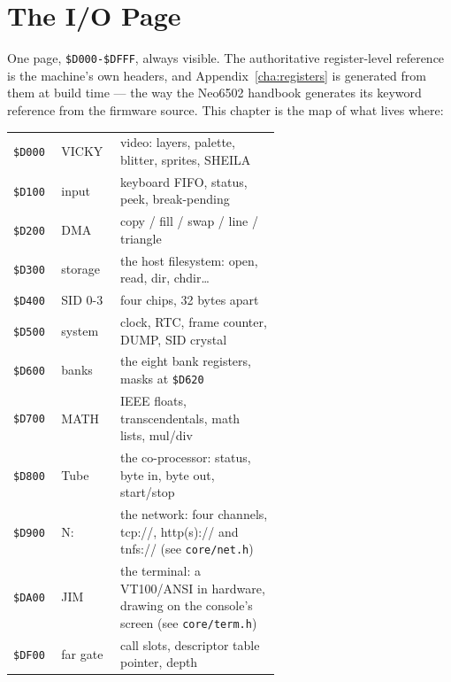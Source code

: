 \chapter{The I/O Page}\label{cha:io}

One page, \texttt{\$D000-\$DFFF}, always visible. The authoritative
register-level reference is the machine's own headers, and
Appendix~\ref{cha:registers} is generated from them at build time --- the
way the Neo6502 handbook generates its keyword reference from the
firmware source. This chapter is the map of what lives where:

\begin{center}
\small
\begin{tabular}{@{}l l >{\raggedright\arraybackslash}p{0.60\linewidth}@{}}
\toprule
\texttt{\$D000} & VICKY   & video: layers, palette, blitter, sprites, SHEILA\\
\texttt{\$D100} & input   & keyboard FIFO, status, peek, break-pending\\
\texttt{\$D200} & DMA     & copy / fill / swap / line / triangle\\
\texttt{\$D300} & storage & the host filesystem: open, read, dir, chdir\ldots\\
\texttt{\$D400} & SID 0-3 & four chips, 32 bytes apart\\
\texttt{\$D500} & system  & clock, RTC, frame counter, DUMP, SID crystal\\
\texttt{\$D600} & banks   & the eight bank registers, masks at \texttt{\$D620}\\
\texttt{\$D700} & MATH    & IEEE floats, transcendentals, math lists, mul/div\\
\texttt{\$D800} & Tube    & the co-processor: status, byte in, byte out, start/stop\\
\texttt{\$D900} & N:      & the network: four channels, tcp://, http(s):// and tnfs:// (see \texttt{core/net.h})\\
\texttt{\$DA00} & JIM     & the terminal: a VT100/ANSI in hardware, drawing on the console's screen (see \texttt{core/term.h})\\
\texttt{\$DF00} & far gate& call slots, descriptor table pointer, depth\\
\bottomrule
\end{tabular}
\end{center}

